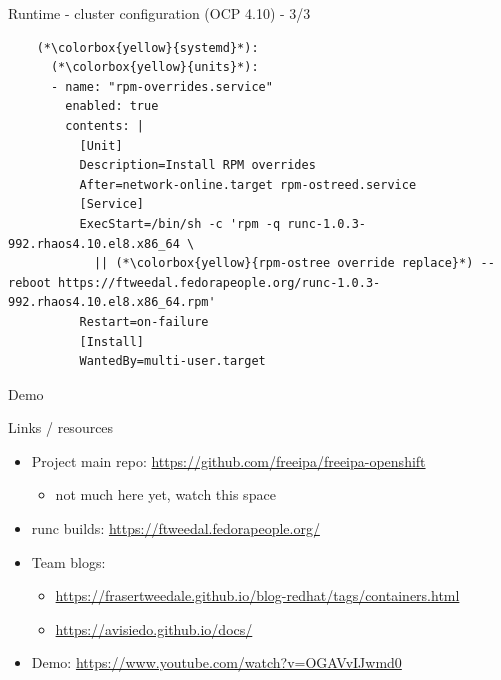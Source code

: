 \documentclass[ignorenonframetext,aspectratio=169,12pt]{beamer}
\begin{document}
\begin{frame}[fragile]{Runtime - cluster configuration (OCP 4.10) - 3/3}
\protect\hypertarget{openshift-cluster-config-2}{}
\begin{lstlisting}
    (*\colorbox{yellow}{systemd}*):
      (*\colorbox{yellow}{units}*):
      - name: "rpm-overrides.service"
        enabled: true
        contents: |
          [Unit]
          Description=Install RPM overrides
          After=network-online.target rpm-ostreed.service
          [Service]
          ExecStart=/bin/sh -c 'rpm -q runc-1.0.3-992.rhaos4.10.el8.x86_64 \
            || (*\colorbox{yellow}{rpm-ostree override replace}*) --reboot https://ftweedal.fedorapeople.org/runc-1.0.3-992.rhaos4.10.el8.x86_64.rpm'
          Restart=on-failure
          [Install]
          WantedBy=multi-user.target
\end{lstlisting}
\end{frame}

\begin{frame}[plain]
\centering
\huge Demo
\end{frame}


\begin{frame}{Links / resources}
\protect\hypertarget{links}{}

\begin{itemize}
\item Project main repo: \url{https://github.com/freeipa/freeipa-openshift}
    \begin{itemize}
    \item not much here yet, watch this space
    \end{itemize}
\item runc builds: \url{https://ftweedal.fedorapeople.org/}
\item Team blogs:
    \begin{itemize}
    \item \url{https://frasertweedale.github.io/blog-redhat/tags/containers.html}
    \item \url{https://avisiedo.github.io/docs/}
    \end{itemize}
\item Demo: \url{https://www.youtube.com/watch?v=OGAVvIJwmd0}
\end{itemize}

\end{frame}
\end{document}
